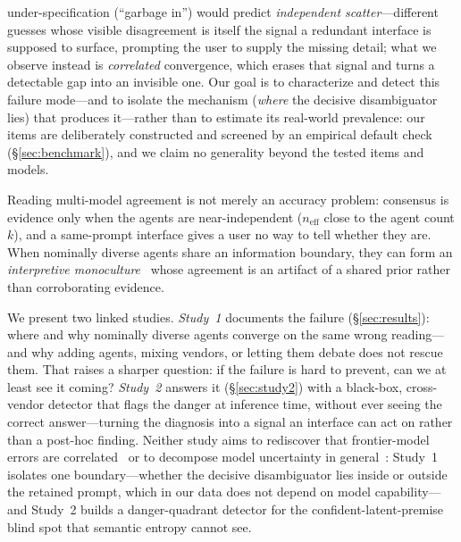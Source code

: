 \documentclass[acmsmall,screen,review,anonymous]{acmart}
\newcommand{\neff}{\ensuremath{n_{\mathrm{eff}}}}
\begin{document}
under-specification (``garbage in'') would predict \emph{independent scatter}---different guesses whose
visible disagreement is itself the signal a redundant interface is supposed to surface, prompting the user to
supply the missing detail; what we observe instead is \emph{correlated} convergence, which erases that signal
and turns a detectable gap into an invisible one.
Our goal is to characterize and detect this failure mode---and to isolate the mechanism
(\emph{where} the decisive disambiguator lies) that produces it---rather than to estimate its real-world
prevalence: our items are deliberately constructed and screened by an empirical default check
(\S\ref{sec:benchmark}), and we claim no generality beyond the tested items and models.

Reading multi-model agreement is not merely
an accuracy problem: consensus is evidence only when the agents are near-independent ($\neff$ close to the
agent count $k$), and a same-prompt interface gives a user no way to tell whether they are. When nominally diverse agents share an information boundary,
they can form an \emph{interpretive monoculture}~\cite{kleinberg2021monoculture} whose agreement is an
artifact of a shared prior rather than corroborating evidence.

We present two linked studies. \emph{Study~1} documents the failure (\S\ref{sec:results}): where and why
nominally diverse agents converge on the same wrong reading---and why adding agents, mixing vendors,
or letting them debate does not rescue them. That raises a sharper question: if the failure is hard to
prevent, can we at least see it coming? \emph{Study~2} answers it (\S\ref{sec:study2}) with a
black-box, cross-vendor detector that flags the danger at inference time, without ever seeing the correct
answer---turning the diagnosis into a signal an interface can act on rather than a post-hoc finding. Neither study aims to rediscover that frontier-model errors are
correlated~\cite{kim2025correlated} or to decompose model uncertainty in general~\cite{hou2024decomposing}:
Study~1 isolates one boundary---whether the decisive disambiguator lies inside or outside the retained
prompt, which in our data does not depend on model capability---and Study~2 builds a danger-quadrant
detector for the confident-latent-premise blind spot that semantic entropy cannot see.
\end{document}
